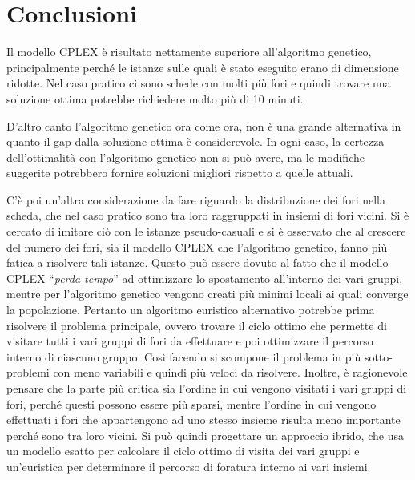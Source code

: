 
\section{Conclusioni}

Il modello CPLEX è risultato nettamente superiore all'algoritmo genetico, principalmente perché le istanze sulle quali è stato eseguito erano di dimensione ridotte. 
Nel caso pratico ci sono schede con molti più fori e quindi trovare una soluzione ottima potrebbe richiedere molto più di 10 minuti.

D'altro canto l'algoritmo genetico ora come ora, non è una grande alternativa in quanto il gap dalla soluzione ottima è considerevole. 
In ogni caso, la certezza dell'ottimalità con l'algoritmo genetico non si può avere, ma le modifiche suggerite potrebbero fornire soluzioni migliori rispetto a quelle attuali.

C'è poi un'altra considerazione da fare riguardo la distribuzione dei fori nella scheda, che nel caso pratico sono tra loro raggruppati in insiemi di fori vicini.
Si è cercato di imitare ciò con le istanze pseudo-casuali e si è osservato che al crescere del numero dei fori, sia il modello CPLEX che l'algoritmo genetico, fanno più fatica a risolvere tali istanze.
Questo può essere dovuto al fatto che il modello CPLEX ``\textit{perda tempo}'' ad ottimizzare lo spostamento all'interno dei vari gruppi, mentre per l'algoritmo genetico vengono creati più minimi locali ai quali converge la popolazione.
Pertanto un algoritmo euristico alternativo potrebbe prima risolvere il problema principale, ovvero trovare il ciclo ottimo che permette di visitare tutti i vari gruppi di fori da effettuare e poi ottimizzare il percorso interno di ciascuno gruppo.
Così facendo si scompone il problema in più sotto-problemi con meno variabili e quindi più veloci da risolvere. 
Inoltre, è ragionevole pensare che la parte più critica sia l'ordine in cui vengono visitati i vari gruppi di fori, perché questi possono essere più sparsi, mentre l'ordine in cui vengono effettuati i fori che appartengono ad uno stesso insieme risulta meno importante perché sono tra loro vicini.
Si può quindi progettare un approccio ibrido, che usa un modello esatto per calcolare il ciclo ottimo di visita dei vari gruppi e un'euristica per determinare il percorso di foratura interno ai vari insiemi. 



